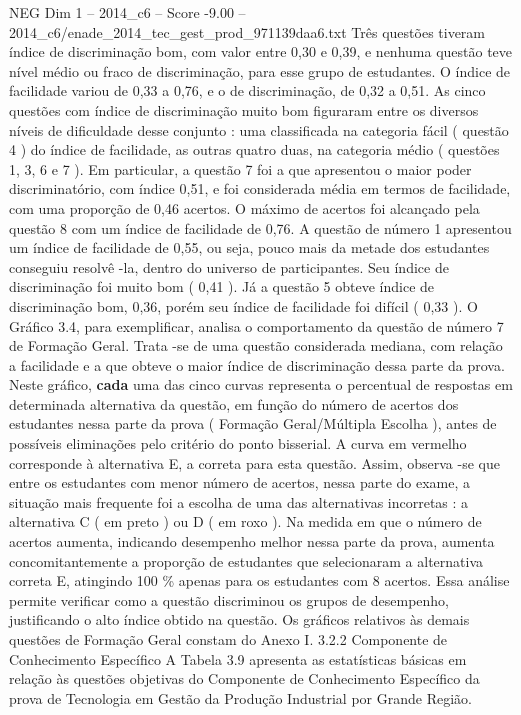 \begin{textsample}{NEG Dim 1 – 2014\_c6 – Score -9.00 – 2014\_c6/enade\_2014\_tec\_gest\_prod\_971139daa6.txt}
Três questões tiveram índice de discriminação bom, com valor entre 0,30 e 0,39, e nenhuma questão teve nível médio ou fraco de discriminação, para esse grupo de estudantes.
O índice de facilidade variou de 0,33 a 0,76, e o de discriminação, de 0,32 a 0,51.
As cinco questões com índice de discriminação muito bom figuraram entre os diversos níveis de dificuldade desse conjunto : uma classificada na categoria fácil ( questão 4 ) do índice de facilidade, as outras quatro duas, na categoria médio ( questões 1, 3, 6 e 7 ).
Em particular, a questão 7 foi a que apresentou o maior poder discriminatório, com índice 0,51, e foi considerada média em termos de facilidade, com uma proporção de 0,46 acertos.
O máximo de acertos foi alcançado pela questão 8 com um índice de facilidade de 0,76.
A questão de número 1 apresentou um índice de facilidade de 0,55, ou seja, pouco mais da metade dos estudantes conseguiu resolvê -la, dentro do universo de participantes.
Seu índice de discriminação foi muito bom ( 0,41 ).
Já a questão 5 obteve índice de discriminação bom, 0,36, porém seu índice de facilidade foi difícil ( 0,33 ).
O Gráfico 3.4, para exemplificar, analisa o comportamento da questão de número 7 de Formação Geral.
Trata -se de uma questão considerada mediana, com relação a facilidade e a que obteve o maior índice de discriminação dessa parte da prova.
Neste gráfico, \textbf{cada} uma das cinco curvas representa o percentual de respostas em determinada alternativa da questão, em função do número de acertos dos estudantes nessa parte da prova ( Formação Geral/Múltipla Escolha ), antes de possíveis eliminações pelo critério do ponto bisserial.
A curva em vermelho corresponde à alternativa E, a correta para esta questão.
Assim, observa -se que entre os estudantes com menor número de acertos, nessa parte do exame, a situação mais frequente foi a escolha de uma das alternativas incorretas : a alternativa C ( em preto ) ou D ( em roxo ).
Na medida em que o número de acertos aumenta, indicando desempenho melhor nessa parte da prova, aumenta concomitantemente a proporção de estudantes que selecionaram a alternativa correta E, atingindo 100 \% apenas para os estudantes com 8 acertos.
Essa análise permite verificar como a questão discriminou os grupos de desempenho, justificando o alto índice obtido na questão.
Os gráficos relativos às demais questões de Formação Geral constam do Anexo I. 3.2.2 Componente de Conhecimento Específico A Tabela 3.9 apresenta as estatísticas básicas em relação às questões objetivas do Componente de Conhecimento Específico da prova de Tecnologia em Gestão da Produção Industrial por Grande Região.

\end{textsample}
